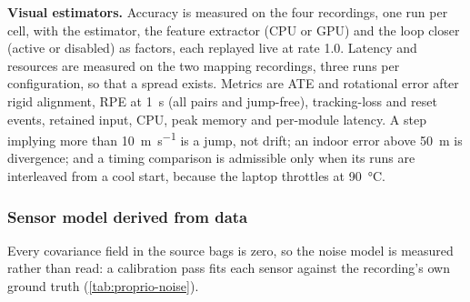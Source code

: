 \textbf{Visual estimators.} Accuracy is measured on the four
 recordings, one run per cell, with the
estimator, the feature extractor (CPU or GPU) and the loop closer (active or
disabled) as factors, each replayed live at rate 1.0. Latency and resources are
measured on the two mapping recordings, three runs per configuration, so that a
spread exists. Metrics are ATE and rotational error after rigid alignment, RPE
at \SI{1}{\second} (all pairs and jump-free), tracking-loss and reset events,
retained input, CPU, peak memory and per-module latency. A step implying more
than \SI{10}{\metre\per\second} is a jump, not drift; an indoor error above
\SI{50}{\metre} is divergence; and a timing comparison is admissible only when
its runs are interleaved from a cool start, because the laptop throttles at
\SI{90}{\celsius}.

\subsubsection{Sensor model derived from data}

Every covariance field in the source bags is zero, so the noise model is
measured rather than read: a calibration pass fits each sensor against the
recording's own ground truth (\cref{tab:proprio-noise}).

